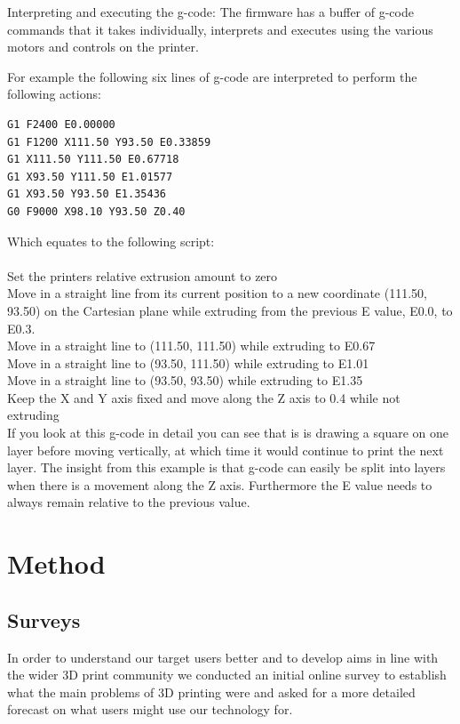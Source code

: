 \documentclass[11pt]{report} %
\begin{document}
Interpreting and executing the g-code: The firmware has a buffer of g-code commands that it takes individually, interprets and executes using the various motors and controls on the printer. 

For example the following six lines of g-code are interpreted to perform the following actions:
\begin{verbatim}
G1 F2400 E0.00000
G1 F1200 X111.50 Y93.50 E0.33859
G1 X111.50 Y111.50 E0.67718
G1 X93.50 Y111.50 E1.01577
G1 X93.50 Y93.50 E1.35436
G0 F9000 X98.10 Y93.50 Z0.40
\end{verbatim}

Which equates to the following script:\\
\\
Set the printers relative extrusion amount to zero\\
Move in a straight line from its current position to a new coordinate (111.50, 93.50) on the Cartesian plane while extruding from the previous E value, E0.0,  to E0.3.\\
Move in a straight line to (111.50, 111.50) while extruding to E0.67\\
Move in a straight line to (93.50, 111.50) while extruding to E1.01\\
Move in a straight line to (93.50, 93.50) while extruding to E1.35\\
Keep the X and Y axis fixed and move along the Z axis to 0.4 while not extruding\\

If you look at this g-code in detail you can see that is is drawing a square on one layer before moving vertically, at which time it would continue to print the next layer. The insight from this example is that g-code can easily be split into layers when there is a movement along the Z axis. Furthermore the E value needs to always remain relative to the previous value. 




\chapter{Method}
\label{section:Method}
\section{Surveys}
In order to understand our target users better and to develop aims in line with the wider 3D print community we conducted an initial online survey to establish what the main problems of 3D printing were and asked for a more detailed forecast on what users might use our technology for. 
\end{document}

